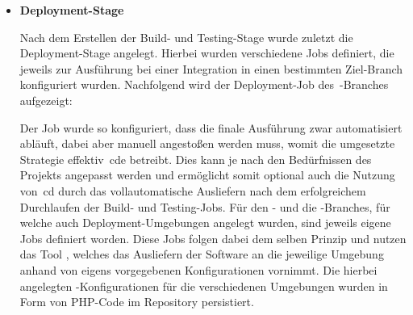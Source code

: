 \begin{itemize}
    \item {
        \textbf{Deployment-Stage}\par
        Nach dem Erstellen der Build- und Testing-Stage wurde zuletzt die Deployment-Stage angelegt.
        Hierbei wurden verschiedene Jobs definiert, die jeweils zur Ausführung bei einer Integration in einen
        bestimmten Ziel-Branch konfiguriert wurden.
        Nachfolgend wird der Deployment-Job des\ -Branches aufgezeigt:

        \vspace{-2.3em}

        Der Job wurde so konfiguriert, dass die finale Ausführung zwar automatisiert abläuft, dabei aber manuell
        angestoßen werden muss, womit die umgesetzte Strategie effektiv\ \acrlong{cde} betreibt.
        Dies kann je nach den Bedürfnissen des Projekts angepasst werden und ermöglicht somit optional auch die
        Nutzung von\ \acrshort{cd} durch das vollautomatische Ausliefern nach dem erfolgreichem Durchlaufen der Build-
        und Testing-Jobs.
        Für den - und die -Branches, für welche auch
        Deployment-Umgebungen angelegt wurden, sind jeweils eigene Jobs definiert worden.
        Diese Jobs folgen dabei dem selben Prinzip und nutzen das Tool , welches das Ausliefern
        der Software an die jeweilige Umgebung anhand von eigens vorgegebenen Konfigurationen vornimmt.
        Die hierbei angelegten -Konfigurationen für die verschiedenen Umgebungen wurden in Form
        von PHP-Code im Repository persistiert.
    }
\end{itemize}

